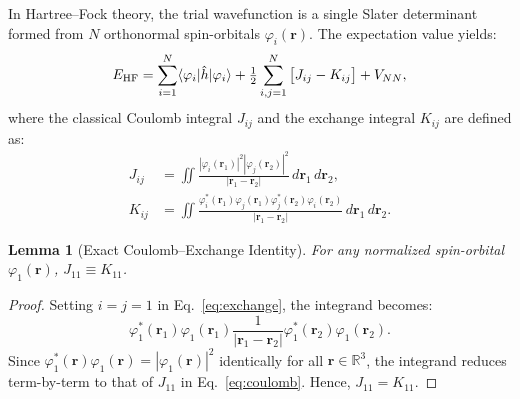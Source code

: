 \documentclass[journal]{IEEEtran}
\newtheorem{lemma}{Lemma}
\begin{document}
In Hartree--Fock theory, the trial wavefunction is a single Slater determinant formed from $N$ orthonormal spin-orbitals $\varphi_i(\mathbf r)$. The expectation value yields:
\begin{equation}
E_{\rm HF} = \sum_{i=1}^N \langle \varphi_i | \hat h | \varphi_i \rangle + \tfrac12 \sum_{i,j=1}^N \big[ J_{ij} - K_{ij} \big] + V_{NN},
\label{eq:hf_energy}
\end{equation}
where the classical Coulomb integral $J_{ij}$ and the exchange integral $K_{ij}$ are defined as:
\begin{align}
J_{ij} &= \iint \frac{|\varphi_i(\mathbf r_1)|^2 |\varphi_j(\mathbf r_2)|^2}{|\mathbf r_1 - \mathbf r_2|} \, d\mathbf r_1 \, d\mathbf r_2, \label{eq:coulomb}\\
K_{ij} &= \iint \frac{\varphi_i^*(\mathbf r_1) \varphi_j(\mathbf r_1) \varphi_j^*(\mathbf r_2) \varphi_i(\mathbf r_2)}{|\mathbf r_1 - \mathbf r_2|} \, d\mathbf r_1 \, d\mathbf r_2. \label{eq:exchange}
\end{align}

\begin{lemma}[Exact Coulomb--Exchange Identity]
\label{lem:coulomb_exchange}
For any normalized spin-orbital $\varphi_1(\mathbf r)$, $J_{11} \equiv K_{11}$.
\end{lemma}
\begin{proof}
Setting $i=j=1$ in Eq.~\eqref{eq:exchange}, the integrand becomes:
\begin{equation}
\varphi_1^*(\mathbf r_1) \varphi_1(\mathbf r_1) \frac{1}{|\mathbf r_1 - \mathbf r_2|} \varphi_1^*(\mathbf r_2) \varphi_1(\mathbf r_2).
\end{equation}
Since $\varphi_1^*(\mathbf r) \varphi_1(\mathbf r) = |\varphi_1(\mathbf r)|^2$ identically for all $\mathbf r \in \mathbb{R}^3$, the integrand reduces term-by-term to that of $J_{11}$ in Eq.~\eqref{eq:coulomb}. Hence, $J_{11} = K_{11}$.
\end{proof}
\end{document}
